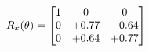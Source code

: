 \documentclass[preview]{standalone}
\begin{document}
\begin{align*}
\special{dvisvgm:raw <g id='unique000'>}R_{x}(\theta) = \begin{bmatrix}1 & 0 & 0 \\0 & +0.77 & -0.64 \\0 & +0.64 & +0.77\end{bmatrix}\special{dvisvgm:raw </g>}
\end{align*}
\end{document}

